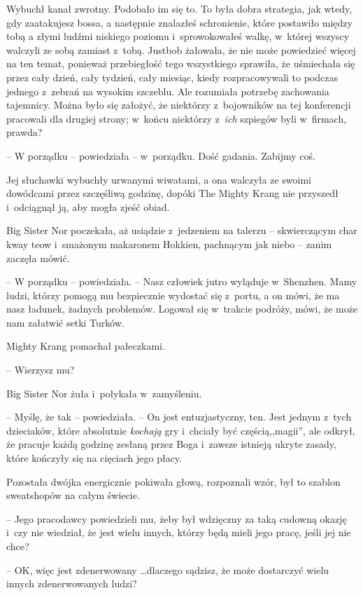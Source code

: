 \documentclass[oneside,polish,11pt,rmheadings]{mwbk}
\begin{document}
Wybuchł kanał zwrotny. Podobało im się to. To była dobra strategia, jak wtedy, gdy zaatakujesz bossa, a następnie znalazłeś schronienie, które postawiło między tobą a złymi ludźmi niskiego poziomu i~sprowokowałeś walkę, w~której wszyscy walczyli ze sobą zamiast z~tobą. Justbob żałowała, że nie może powiedzieć więcej na ten temat, ponieważ przebiegłość tego wszystkiego sprawiła, że uśmiechała się przez cały dzień, cały tydzień, cały miesiąc, kiedy rozpracowywali to podczas jednego z~zebrań na wysokim szczeblu. Ale rozumiała potrzebę zachowania tajemnicy. Można było się założyć, że niektórzy z~bojowników na tej konferencji pracowali dla drugiej strony; w~końcu niektórzy z~\textit{ich }szpiegów byli w~firmach, prawda?

-- W porządku -- powiedziała -- w~porządku. Dość gadania. Zabijmy coś. 

 Jej słuchawki wybuchły urwanymi wiwatami, a ona walczyła ze swoimi dowódcami przez szczęśliwą godzinę, dopóki The Mighty Krang nie przyszedł i~odciągnął ją, aby mogła zjeść obiad.

Big Sister Nor poczekała, aż usiądzie z~jedzeniem na talerzu -- skwierczącym char kway teow i~smażonym makaronem Hokkien, pachnącym jak niebo -- zanim zaczęła mówić.

-- W porządku -- powiedziała. -- Nasz człowiek jutro wyląduje w~Shenzhen. Mamy ludzi, którzy pomogą mu bezpiecznie wydostać się z~portu, a on mówi, że ma nasz ładunek, żadnych problemów. Logował się w~trakcie podróży, mówi, że może nam załatwić setki Turków.

Mighty Krang pomachał pałeczkami. 

-- Wierzysz mu?

Big Sister Nor żuła i~połykała w~zamyśleniu. 

-- Myślę, że tak -- powiedziała. -- On jest entuzjastyczny, ten. Jest jednym z~tych dzieciaków, które absolutnie \textit{kochają }gry i~chciały być częścią,,magii'', ale odkrył, że pracuje każdą godzinę zesłaną przez Boga i~zawsze istnieją ukryte zasady, które kończyły się na cięciach jego płacy. 

 Pozostała dwójka energicznie pokiwała głową, rozpoznali wzór, był to szablon sweatshopów na całym świecie.
 
 -- Jego pracodawcy powiedzieli mu, żeby był wdzięczny za taką cudowną okazję i~czy nie wiedział, że jest wielu innych, którzy będą mieli jego pracę, jeśli jej nie chce?

-- OK, więc jest zdenerwowany  \ldots  dlaczego sądzisz, że może dostarczyć wielu innych zdenerwowanych ludzi? 
\end{document}
